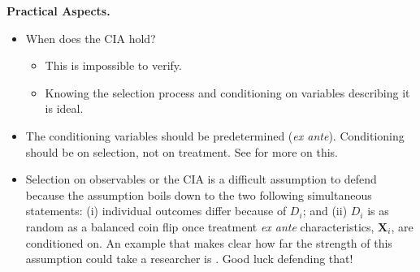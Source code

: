 \noindent \textbf{Practical Aspects.} 
	\begin{itemize}
		\item When does the CIA hold?
			\begin{itemize}
				\item This is impossible to verify.
				\item Knowing the selection process and conditioning on variables describing it is ideal. 
			\end{itemize}
		\item The conditioning variables should be predetermined (\textit{ex ante}). Conditioning should be on selection, not on treatment. See \citet{neal_role_1996} for more on this. 
		\item Selection on observables or the CIA is a difficult assumption to defend because the assumption boils down to the two following simultaneous statements: (i) individual outcomes differ because of $D_i$; and (ii) $D_{i}$ is as random as a balanced coin flip once treatment \textit{ex ante} characteristics, $\bm{X}_{i}$, are conditioned on. An example that makes clear how far the strength of this assumption could take a researcher is \citet{heckman_effect_2010}. Good luck defending that!
	\end{itemize}

\singlespacing






